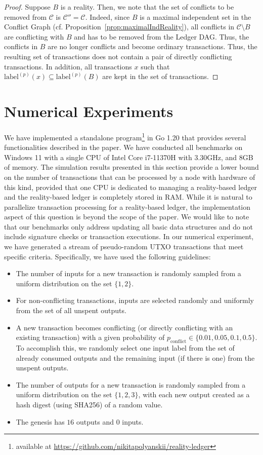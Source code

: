 \documentclass[11pt]{article}
\newcommand{\lab}{\mathrm{label}}
\newcommand{\conflictset}{\mathcal{C}}
\theoremstyle{plain}
\theoremstyle{definition}
\numberwithin{definition}{section}
\numberwithin{lemma}{section}
\numberwithin{ass}{section}
\numberwithin{remark}{section}
\numberwithin{example}{section}
\numberwithin{proposition}{section}
\numberwithin{theorem}{section}
\begin{document}
\begin{proof}
Suppose ${B}$ is a reality. Then, we note that the set of conflicts to be removed from $\conflictset$  is $\conflictset'' = \conflictset$. Indeed, since $B$ is a maximal independent set in the Conflict Graph (cf. Proposition~\ref{prop:maximalIndReality}), all conflicts in $\conflictset \setminus B$ are conflicting with $B$  and has to be removed from the Ledger DAG. Thus, the conflicts in $B$ are no longer conflicts and become ordinary transactions. Thus, the resulting set of transactions does not contain a pair of directly conflicting transactions. In addition, all transactions $x$ such that $\lab^{(p)}(x)\subseteq \lab^{(p)}(B)$ are kept in the set of transactions.
\end{proof}


\section{Numerical Experiments}\label{sec: numerical experiments}
We have implemented a standalone program\footnote{available at \url{https://github.com/nikitapolyanskii/reality-ledger}} in Go 1.20 that provides several functionalities described in the paper. We have conducted all benchmarks on Windows 11 with a single CPU of Intel Core i7-11370H with 3.30GHz, and 8GB of memory. The simulation results presented in this section provide a lower bound on the number of transactions that can be processed by a node with hardware of this kind, provided that one CPU is dedicated to managing a reality-based ledger and the reality-based ledger is completely stored in RAM. While it is natural to parallelize transaction processing for a reality-based ledger, the implementation aspect of this question is beyond the scope of the paper. We would like to note that our benchmarks only address updating all basic data structures and do not include signature checks or transaction executions.
In our numerical experiment, we have generated a stream of pseudo-random UTXO transactions that meet specific criteria. Specifically, we have used the following guidelines:
\begin{itemize}
   \item The number of inputs for a new transaction is randomly sampled from a uniform distribution on the set $\{1,2\}$.
   \item For non-conflicting transactions, inputs are selected randomly and uniformly from the set of all unspent outputs. 
   \item A new transaction becomes conflicting (or directly conflicting with an existing transaction) with a given probability of $p_{\textrm{conflict}}\in\{0.01,0.05,0.1, 0.5\}$. To accomplish this, we randomly select one input label from the set of already consumed outputs and the remaining input (if there is one) from the unspent outputs. 
    \item The number of outputs for a new transaction is randomly sampled from a uniform distribution on the set $\{1,2,3\}$, with each new output created as a hash digest (using SHA256) of a random value.    
    \item The genesis has $16$ outputs and $0$ inputs.
\end{itemize}
\end{document}
